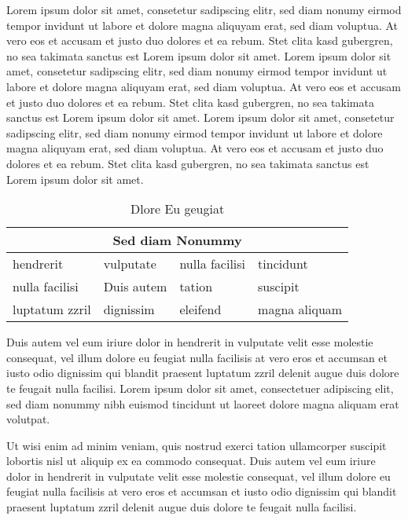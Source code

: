 \documentclass[]{../thesis}
\begin{document}
    Lorem ipsum dolor sit amet, consetetur sadipscing elitr, sed diam nonumy eirmod tempor invidunt ut labore et dolore magna aliquyam erat, sed diam voluptua. At vero eos et accusam et justo duo dolores et ea rebum. Stet clita kasd gubergren, no sea takimata sanctus est Lorem ipsum dolor sit amet. Lorem ipsum dolor sit amet, consetetur sadipscing elitr, sed diam nonumy eirmod tempor invidunt ut labore et dolore magna aliquyam erat, sed diam voluptua. At vero eos et accusam et justo duo dolores et ea rebum. Stet clita kasd gubergren, no sea takimata sanctus est Lorem ipsum dolor sit amet. Lorem ipsum dolor sit amet, consetetur sadipscing elitr, sed diam nonumy eirmod tempor invidunt ut labore et dolore magna aliquyam erat, sed diam voluptua. At vero eos et accusam et justo duo dolores et ea rebum. Stet clita kasd gubergren, no sea takimata sanctus est Lorem ipsum dolor sit amet.   
    
    \begin{table}[h!]
        \begin{tabular}{ |p{3cm}||p{3cm}|p{3cm}|p{3cm}|  }
             \hline
             \multicolumn{4}{|c|}{Sed diam Nonummy} \\
             \hline
             hendrerit   & vulputate    & nulla facilisi & tincidunt\\
             nulla facilisi &   Duis autem  & tation   & suscipit\\
             luptatum zzril & dignissim & eleifend &  magna aliquam \\
             \hline
            
        \end{tabular}
        \caption{Dlore Eu geugiat}
    \end{table}
    
    Duis autem vel eum iriure dolor in hendrerit in vulputate velit esse molestie consequat, vel illum dolore eu feugiat nulla facilisis at vero eros et accumsan et iusto odio dignissim qui blandit praesent luptatum zzril delenit augue duis dolore te feugait nulla facilisi. Lorem ipsum dolor sit amet, consectetuer adipiscing elit, sed diam nonummy nibh euismod tincidunt ut laoreet dolore magna aliquam erat volutpat.   
    
    Ut wisi enim ad minim veniam, quis nostrud exerci tation ullamcorper suscipit lobortis nisl ut aliquip ex ea commodo consequat. Duis autem vel eum iriure dolor in hendrerit in vulputate velit esse molestie consequat, vel illum dolore eu feugiat nulla facilisis at vero eros et accumsan et iusto odio dignissim qui blandit praesent luptatum zzril delenit augue duis dolore te feugait nulla facilisi.   
    
\end{document}
